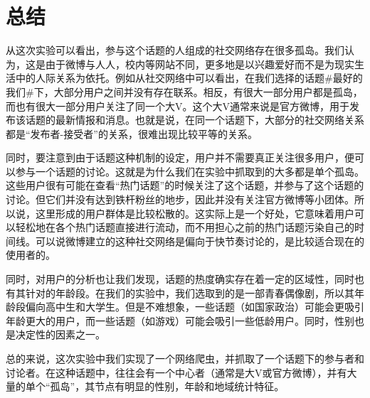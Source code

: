 \documentclass[a4paper,UTF8]{ctexart}
\begin{document}
\section{总结}\label{ux603bux7ed3}

从这次实验可以看出，参与这个话题的人组成的社交网络存在很多孤岛。我们认为，这是由于微博与人人，校内等网站不同，更多地是以兴趣爱好而不是为现实生活中的人际关系为依托。例如从社交网络中可以看出，在我们选择的话题\#最好的我们\#下，大部分用户之间并没有存在联系。相反，有很大一部分用户都是孤岛，而也有很大一部分用户关注了同一个大V。这个大V通常来说是官方微博，用于发布该话题的最新情报和消息。也就是说，在同一个话题下，大部分的社交网络关系都是``发布者-接受者''的关系，很难出现比较平等的关系。

同时，要注意到由于话题这种机制的设定，用户并不需要真正关注很多用户，便可以参与一个话题的讨论。这就是为什么我们在实验中抓取到的大多都是单个孤岛。这些用户很有可能在查看``热门话题''的时候关注了这个话题，并参与了这个话题的讨论。但它们并没有达到铁杆粉丝的地步，因此并没有关注官方微博等小团体。所以说，这里形成的用户群体是比较松散的。这实际上是一个好处，它意味着用户可以轻松地在各个热门话题直接进行流动，而不用担心之前的热门话题污染自己的时间线。可以说微博建立的这种社交网络是偏向于快节奏讨论的，是比较适合现在的使用者的。

同时，对用户的分析也让我们发现，话题的热度确实存在着一定的区域性，同时也有其针对的年龄段。在我们的实验中，我们选取到的是一部青春偶像剧，所以其年龄段偏向高中生和大学生。但是不难想象，一些话题（如国家政治）可能会更吸引年龄更大的用户，而一些话题（如游戏）可能会吸引一些低龄用户。同时，性别也是决定性的因素之一。

总的来说，这次实验中我们实现了一个网络爬虫，并抓取了一个话题下的参与者和讨论者。在这种话题中，往往会有一个中心者（通常是大V或官方微博），并有大量的单个``孤岛''，其节点有明显的性别，年龄和地域统计特征。
\end{document}
